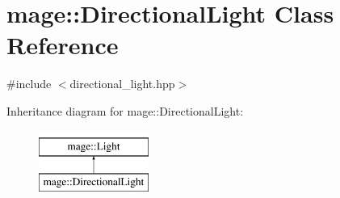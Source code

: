 \hypertarget{classmage_1_1_directional_light}{}\section{mage\+:\+:Directional\+Light Class Reference}
\label{classmage_1_1_directional_light}


{\ttfamily \#include $<$directional\+\_\+light.\+hpp$>$}

Inheritance diagram for mage\+:\+:Directional\+Light\+:\begin{figure}[H]
\begin{center}
\leavevmode
\includegraphics[height=2.000000cm]{classmage_1_1_directional_light}
\end{center}
\end{figure}
